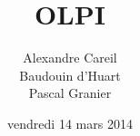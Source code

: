 


\newcommand*\titre{OLPI}
\title{\titre}
\author{Alexandre Careil\\
Baudouin d'Huart\\
Pascal Granier\\
}
\date{vendredi 14 mars 2014}





\newpage
\tableofcontents







\label{lastPage} %

